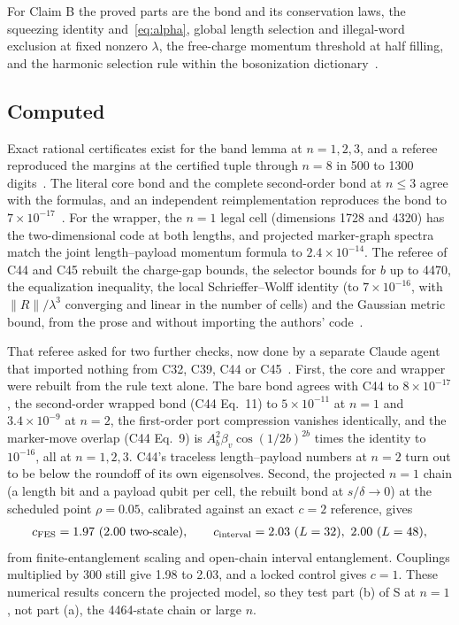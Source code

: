 \documentclass[11pt]{article}
\theoremstyle{definition}
\begin{document}
For Claim B the proved parts are the bond and its conservation laws, the squeezing identity and~\eqref{eq:alpha}, global length selection and illegal-word exclusion at fixed nonzero $\lambda$, the free-charge momentum threshold at half filling, and the harmonic selection rule within the bosonization dictionary~\cite{campaign,C41}.

\subsection{Computed}
\label{sec:computed}

Exact rational certificates exist for the band lemma at $n=1,2,3$, and a referee reproduced the margins at the certified tuple through $n=8$ in 500 to 1300 digits~\cite{refC39}. The literal core bond and the complete second-order bond at $n\le3$ agree with the formulas, and an independent reimplementation reproduces the bond to $7\times10^{-17}$~\cite{refC39}. For the wrapper, the $n=1$ legal cell (dimensions 1728 and 4320) has the two-dimensional code at both lengths, and projected marker-graph spectra match the joint length--payload momentum formula to $2.4\times10^{-14}$. The referee of C44 and C45 rebuilt the charge-gap bounds, the selector bounds for $b$ up to 4470, the equalization inequality, the local Schrieffer--Wolff identity (to $7\times10^{-16}$, with $\|R\|/\lambda^3$ converging and linear in the number of cells) and the Gaussian metric bound, from the prose and without importing the authors' code~\cite{refC44}.

That referee asked for two further checks, now done by a separate Claude agent that imported nothing from C32, C39, C44 or C45~\cite{verC44}. First, the core and wrapper were rebuilt from the rule text alone. The bare bond agrees with C44 to $8\times10^{-17}$, the second-order wrapped bond (C44 Eq.~11) to $5\times10^{-11}$ at $n=1$ and $3.4\times10^{-9}$ at $n=2$, the first-order port compression vanishes identically, and the marker-move overlap (C44 Eq.~9) is $A_b^2\beta_v\cos(1/2b)^{2b}$ times the identity to $10^{-16}$, all at $n=1,2,3$. C44's traceless length--payload numbers at $n=2$ turn out to be below the roundoff of its own eigensolves. Second, the projected $n=1$ chain (a length bit and a payload qubit per cell, the rebuilt bond at $s/\delta\to0$) at the scheduled point $\rho=0.05$, calibrated against an exact $c=2$ reference, gives
\begin{align}
c_{\rm FES}=1.97\ (2.00\ \text{two-scale}),\qquad c_{\rm interval}=2.03\ (L=32),\ 2.00\ (L=48),
\label{eq:cn1}
\end{align}
from finite-entanglement scaling and open-chain interval entanglement. Couplings multiplied by 300 still give 1.98 to 2.03, and a locked control gives $c=1$. These numerical results concern the projected model, so they test part (b) of S at $n=1$, not part (a), the 4464-state chain or large $n$.
\end{document}
